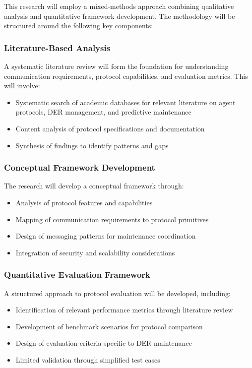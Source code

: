 \documentclass[12pt,a4paper]{article}
\begin{document}
This research will employ a mixed-methods approach combining qualitative analysis and quantitative framework development. The methodology will be structured around the following key components:

\subsubsection{Literature-Based Analysis}
A systematic literature review will form the foundation for understanding communication requirements, protocol capabilities, and evaluation metrics. This will involve:
\begin{itemize}
    \item Systematic search of academic databases for relevant literature on agent protocols, DER management, and predictive maintenance
    \item Content analysis of protocol specifications and documentation
    \item Synthesis of findings to identify patterns and gaps
\end{itemize}

\subsubsection{Conceptual Framework Development}
The research will develop a conceptual framework through:
\begin{itemize}
    \item Analysis of protocol features and capabilities
    \item Mapping of communication requirements to protocol primitives
    \item Design of messaging patterns for maintenance coordination
    \item Integration of security and scalability considerations
\end{itemize}

\subsubsection{Quantitative Evaluation Framework}
A structured approach to protocol evaluation will be developed, including:
\begin{itemize}
    \item Identification of relevant performance metrics through literature review
    \item Development of benchmark scenarios for protocol comparison
    \item Design of evaluation criteria specific to DER maintenance
    \item Limited validation through simplified test cases
\end{itemize}
\end{document}
